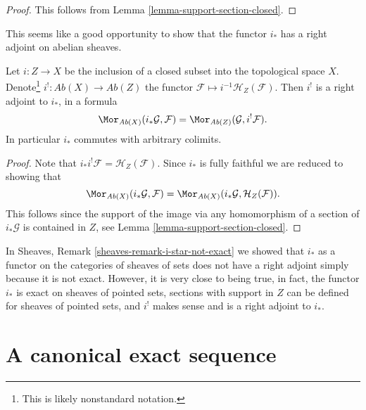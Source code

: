 \begin{proof}
This follows from Lemma \ref{lemma-support-section-closed}.
\end{proof}

\noindent
This seems like a good opportunity to show that the functor
$i_*$ has a right adjoint on abelian sheaves.

\begin{lemma}
\label{lemma-i-star-right-adjoint}
Let $i : Z \to X$ be the inclusion of a closed subset into the
topological space $X$.
Denote\footnote{This is likely nonstandard notation.}
$i^! : \textit{Ab}(X) \to \textit{Ab}(Z)$ the functor
$\mathcal{F} \mapsto i^{-1}\mathcal{H}_Z(\mathcal{F})$.
Then $i^!$ is a right adjoint to $i_*$, in a formula
$$
\Mor_{\textit{Ab}(X)}(i_*\mathcal{G}, \mathcal{F})
=
\Mor_{\textit{Ab}(Z)}(\mathcal{G}, i^!\mathcal{F}).
$$
In particular $i_*$ commutes with arbitrary colimits.
\end{lemma}

\begin{proof}
Note that $i_*i^!\mathcal{F} = \mathcal{H}_Z(\mathcal{F})$.
Since $i_*$ is fully faithful we are reduced to showing that
$$
\Mor_{\textit{Ab}(X)}(i_*\mathcal{G}, \mathcal{F})
=
\Mor_{\textit{Ab}(X)}(i_*\mathcal{G}, \mathcal{H}_Z(\mathcal{F})).
$$
This follows since the support of the image via any homomorphism
of a section of $i_*\mathcal{G}$ is contained in $Z$, see
Lemma \ref{lemma-support-section-closed}.
\end{proof}

\begin{remark}
\label{remark-i-star-right-adjoint}
In Sheaves, Remark \ref{sheaves-remark-i-star-not-exact}
we showed that $i_*$ as a functor
on the categories of sheaves of sets
does not have a right adjoint simply because
it is not exact. However, it is very close to being
true, in fact, the functor $i_*$ is exact on sheaves
of pointed sets, sections with support in $Z$ can
be defined for sheaves of pointed sets, and $i^!$
makes sense and is a right adjoint to $i_*$.
\end{remark}









\section{A canonical exact sequence}
\label{section-canonical-exact-sequence}

